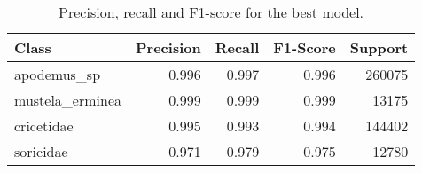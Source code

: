 \begin{table}[H]
\caption{Precision, recall and F1-score for the best model.}
\label{tab:precision_recall_fscore_support}
\begin{tabular}{l r r r r}
\toprule
Class & Precision & Recall & F1-Score & Support \\
\midrule
apodemus\_sp & 0.996 & 0.997 & 0.996 & 260075 \\
mustela\_erminea & 0.999 & 0.999 & 0.999 & 13175 \\
cricetidae & 0.995 & 0.993 & 0.994 & 144402 \\
soricidae & 0.971 & 0.979 & 0.975 & 12780 \\
\bottomrule
\end{tabular}
\end{table}
